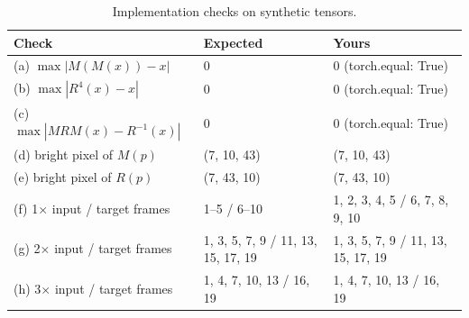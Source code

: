 \begin{table}[H]
\centering\small
\begin{tabular}{lll}
\toprule
Check & Expected & Yours \\
\midrule
(a) $\max|M(M(x)) - x|$ & 0 & 0 (torch.equal: True) \\
(b) $\max|R^4(x) - x|$ & 0 & 0 (torch.equal: True) \\
(c) $\max|MRM(x) - R^{-1}(x)|$ & 0 & 0 (torch.equal: True) \\
(d) bright pixel of $M(p)$ & (7, 10, 43) & (7, 10, 43) \\
(e) bright pixel of $R(p)$ & (7, 43, 10) & (7, 43, 10) \\
(f) 1$\times$ input / target frames & 1--5 / 6--10 & 1, 2, 3, 4, 5 / 6, 7, 8, 9, 10 \\
(g) 2$\times$ input / target frames & 1, 3, 5, 7, 9 / 11, 13, 15, 17, 19 & 1, 3, 5, 7, 9 / 11, 13, 15, 17, 19 \\
(h) 3$\times$ input / target frames & 1, 4, 7, 10, 13 / 16, 19 & 1, 4, 7, 10, 13 / 16, 19 \\
\bottomrule
\end{tabular}
\caption{Implementation checks on synthetic tensors.}
\label{tab:q2-1}
\end{table}